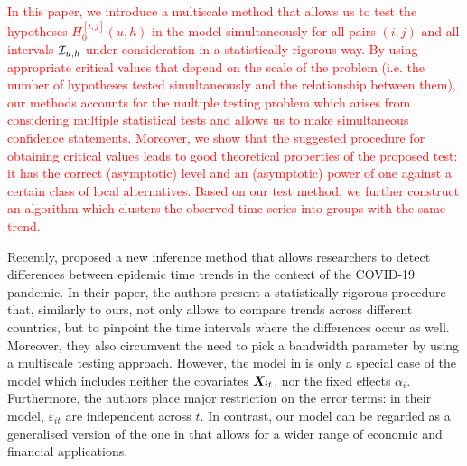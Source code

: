 \documentclass[a4paper,12pt]{article}
\makeatletter
\renewcommand{\eqref}[1]{\tagform@{\ref{#1}}}
\makeatother
\begin{document}
\textcolor{red}{In this paper, we introduce a multiscale method that allows us to test the hypotheses $H_0^{[i, j]}(u, h)$ in the model \eqref{eq:model} simultaneously for all pairs $(i, j)$ and all intervals $\mathcal{I}_{u, h}$ under consideration in a statistically rigorous way. By using appropriate critical values that depend on the scale of the problem (i.e. the number of hypotheses tested simultaneously and the relationship between them), our methods accounts for the multiple testing problem which arises from considering multiple statistical tests and allows us to make simultaneous confidence statements. Moreover, we show that the suggested procedure for obtaining critical values leads to good theoretical properties of the proposed test: it has the correct (asymptotic) level and an (asymptotic) power of one against a certain class of local alternatives. Based on our test method, we further construct an algorithm which clusters the observed time series into groups with the same trend.}



Recently, \cite{KhismatullinaVogt2021} proposed a new inference method that allows researchers to detect differences between epidemic time trends in the context of the COVID-19 pandemic. In their paper, the authors present a statistically rigorous procedure that, similarly to ours, not only allows to compare trends across different countries, but to pinpoint the time intervals where the differences occur as well. Moreover, they also circumvent the need to pick a bandwidth parameter by using a multiscale testing approach. However, the model in \cite{KhismatullinaVogt2021} is only a special case of the model \eqref{eq:model} which includes neither the covariates $\boldsymbol{X}_{it}$, nor the fixed effects $\alpha_i$. Furthermore, the authors place major restriction on the error terms: in their model, $\varepsilon_{it}$ are independent across $t$. In contrast, our model \eqref{eq:model} can be regarded as a generalised version of the one in \cite{KhismatullinaVogt2021} that allows for a wider range of economic and financial applications.

\end{document}
